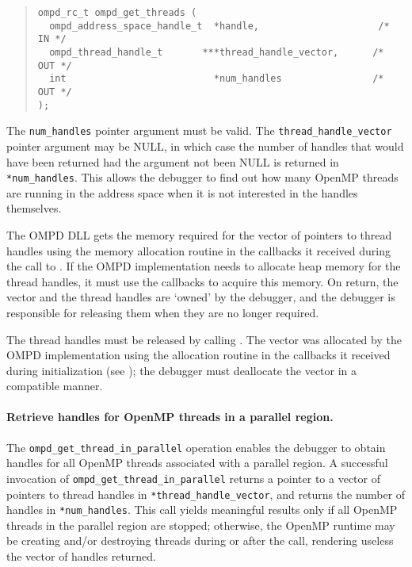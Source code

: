 \begin{quote}
\begin{lstlisting}
ompd_rc_t ompd_get_threads (
  ompd_address_space_handle_t  *handle,                     /* IN */
  ompd_thread_handle_t       ***thread_handle_vector,      /* OUT */
  int                          *num_handles                /* OUT */
);
\end{lstlisting}
\end{quote}

The \texttt{num\_handles} pointer argument must be valid.
The \texttt{thread\_handle\_vector} pointer argument may be NULL,
in which case the number of handles that would have been returned
had the argument not been NULL is returned in \texttt{*num\_handles}.
This allows the debugger to find out how many OpenMP threads are
running in the address space when it is not interested in the handles 
themselves.

The OMPD DLL gets the memory required for the vector of pointers to thread 
handles using the memory allocation routine in the callbacks it received during
the call to . If the OMPD 
implementation needs to allocate heap memory for the thread handles, it must 
use the callbacks to acquire this memory. On return, the vector and the thread 
handles are `owned' by the debugger, and the debugger is responsible for 
releasing them when they are no longer required.

The thread handles must be released by calling 
.
The vector was allocated by the OMPD implementation using the allocation 
routine in the callbacks it received during
initialization (see );
the debugger must deallocate the vector in a compatible manner.

\paragraph{Retrieve handles for OpenMP threads in a parallel region.}
The  \verb|ompd_get_thread_in_parallel| operation enables the debugger
to obtain handles for all OpenMP threads associated with a parallel region.
A successful invocation of  \verb|ompd_get_thread_in_parallel|
returns a pointer to a vector of pointers to thread handles in
\verb|*thread_handle_vector|,
and returns the number of handles in \verb|*num_handles|.
This call yields meaningful results only if all OpenMP threads
in the parallel region are stopped; otherwise, the OpenMP runtime
may be creating and/or destroying threads during or after the call,
rendering useless the vector of handles returned.

